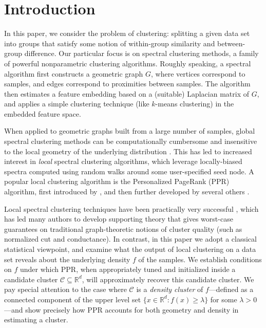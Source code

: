 \documentclass[11pt,twoside]{article}
\newcommand{\Reals}{\mathbb{R}}
\newcommand{\1}{\mathbf{1}}
\newcommand{\Rd}{\Reals^d}
\newcommand{\mc}[1]{\mathcal{#1}}
\begin{document}
\section{Introduction}
In this paper, we consider the problem of clustering: splitting a given data set into groups that satisfy some notion of within-group similarity and between-group difference.  Our particular focus is on spectral clustering methods, a family of powerful nonparametric clustering algorithms. Roughly speaking, a spectral algorithm first constructs a geometric graph $G$, where vertices correspond to samples, and edges correspond to proximities between samples. The algorithm then estimates a feature embedding based on a (suitable) Laplacian matrix of $G$, and applies a simple clustering technique (like $k$-means clustering) in the embedded feature space.

When applied to geometric graphs built from a large number of samples, global spectral clustering methods can be computationally cumbersome and insensitive to the local geometry of the underlying distribution \citep{leskovec2010,mahoney2012}.  This has led to increased interest in \emph{local} spectral clustering algorithms, which leverage locally-biased spectra computed using random walks around some user-specified seed node.  A popular local clustering algorithm is the Personalized PageRank (PPR) algorithm, first introduced by \citet{haveliwala2003}, and then further developed by several others \citep{spielman2011,spielman2014,andersen2006,mahoney2012,zhu2013}.

Local spectral clustering techniques have been practically very successful \citep{leskovec2010,andersen2012,gleich2012,mahoney2012,wu2012}, which has led many authors to develop supporting theory \citep{spielman2013,andersen2009,gharan2012,zhu2013} that gives worst-case guarantees on traditional graph-theoretic notions of cluster quality (such as normalized cut and conductance). In contrast, in this paper we adopt a classical statistical viewpoint, and examine what the output of local clustering on a data set reveals about the underlying density $f$ of the samples. We establish conditions on $f$ under which PPR, when appropriately tuned and initialized inside a candidate cluster $\mc{C} \subseteq \Rd$, will approximately recover this candidate cluster. We pay special attention to the case where $\mc{C}$ is a \emph{density cluster} of $f$---defined as a connected component of the upper level set $\{x \in \Rd : f(x) \geq \lambda\}$ for some $\lambda > 0$---and show precisely how PPR accounts for both geometry and density in estimating a cluster.
\end{document}

